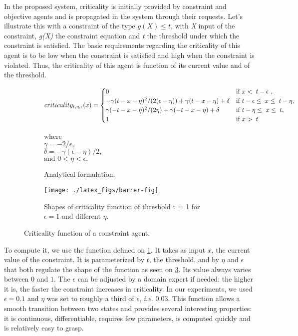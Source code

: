In the proposed system, criticality is initially provided by constraint and objective agents and is propagated in the system through their requests.
Let's illustrate this with a constraint of the type \(g(X) \leq t\), with \emph{X} input of the constraint, \emph{g(X)} the constraint equation and \emph{t} the threshold under which the constraint is satisfied. The basic requirements regarding the criticality of this agent is to be low when the constraint is satisfied and high when the constraint is violated. Thus, the criticality of this agent is function of its current value and of the threshold.


\begin{figure}
	\centering
	\begin{subfigure}[b]{\textwidth}
	  \centering
	  \scriptsize
	  
		\[criticality_{t,\eta,\epsilon}(x)=
			\begin{cases}
				0		&\text{if \( x < \; t - \epsilon \) },\\
				-\gamma ( t - x - \eta ) ^ 2 / ( 2 ( \epsilon - \eta)) + \gamma ( t - x - \eta ) + \delta &\text{if \(t - \epsilon \leq \;x \leq \;t - \eta \)},\\
				\gamma (-t-x-\eta)^2/(2 \eta)+\gamma (-t-x-\eta) + \delta &\text{if \(t - \eta \leq \;x \leq \;t\)},\\
				1	&\text{if \( x > \; t \)}
			\end{cases}\]

		where\\
		$\gamma = -2/ \epsilon,$\\
		$\delta = -\gamma (\epsilon - \eta )/2,$\\
		$\text{and } 0 < \eta < \epsilon.$
	  \caption{Analytical formulation.}\label{crit_func}
	\end{subfigure}
	
	\begin{subfigure}[b]{\textwidth}
		\centering
		\texttt{[image: ./latex\_figs/barrer-fig]}
		\caption{Shapes of criticality function of threshold t = 1 for \(\epsilon=1\) and different \(\eta\).}\label{crit_shapes}
	\end{subfigure}
	
\caption{Criticality function of a constraint agent.}
\end{figure}

To compute it, we use the function defined on \figurename{} \ref{crit_func}. It takes as input \(x\), the current value of the constraint. It is parameterized by \(t\), the threshold, and by \(\eta\) and \(\epsilon\) that both regulate the shape of the function as seen on \figurename{} \ref{crit_shapes}. Its value always varies between \(0\) and \(1\).
The \(\epsilon\) can be adjusted by a domain expert if needed: the higher it is, the faster the constraint increases in criticality.
In our experiments, we used $\epsilon = 0.1$ and  $\eta$ was set to roughly a third of $\epsilon$, \textit{i.e.} 0.03.
This function allows a smooth transition between two states and provides several interesting properties: it is continuous, differentiable, requires few parameters, is computed quickly and is relatively easy to grasp.


